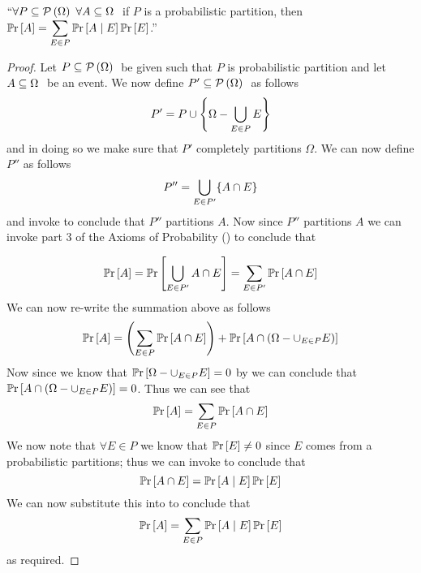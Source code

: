         \begin{theorem}
            $``\forall P \subseteq \mathcal{P}\left(\Omega\right) \  \forall A \subseteq \Omega \ $
            if $P$ is a probabilistic partition, then $\mathbb{P}\mathrm{r} \left[A\right] = \displaystyle\sum_{E \in P} \mathbb{P}\mathrm{r}\left[A \mid E\right] \mathbb{P}\mathrm{r} \left[E\right]$.''
            \label{The Law of Total Probability}
        \end{theorem}
        \begin{proof}
            Let $P \subseteq \mathcal{P}\left(\Omega\right) \ $ be given such that $P$ is probabilistic partition
            and let $A \subseteq \Omega \ $ be an event. We now define $P' \subseteq \mathcal{P}\left(\Omega\right) \ $
            as follows
            \[
                P' = P \cup \left\{\Omega - \displaystyle\bigcup_{E \in P} E\right\}
            \]
            and in doing so we make sure that $P'$ completely partitions $\Omega$. We
            can now define $P''$ as follows
            \[
                P'' = \displaystyle\bigcup_{E \in P'} \{A \cap E\}
            \]
            and invoke  to conclude that $P''$ partitions $A$.
            Now since $P''$ partitions $A$ we can invoke part 3 of the Axioms of Probability
            () to conclude that

            \[
                \mathbb{P}\mathrm{r} \left[A\right] = \mathbb{P}\mathrm{r} \left[\displaystyle\bigcup_{E \in P'} A \cap E\right] = \sum_{E \in P'} \mathbb{P}\mathrm{r} \left[A \cap E\right]
            \]
            We can now re-write the summation above as follows
            \[
                \mathbb{P}\mathrm{r} \left[A\right] = \left(\sum_{E \in P} \mathbb{P}\mathrm{r} \left[A \cap E\right]\right) + \mathbb{P}\mathrm{r} \left[A \cap \left(\Omega - \cup_{E \in P} E\right)\right]
            \]
            Now since we know that $\mathbb{P}\mathrm{r} \left[\Omega - \cup_{E \in P} E\right] = 0$ by 
            we can conclude that $\mathbb{P}\mathrm{r} \left[A \cap \left(\Omega - \cup_{E \in P} E\right)\right] = 0$. Thus
            we can see that
            \begin{equation}
                \mathbb{P}\mathrm{r} \left[A\right] = \sum_{E \in P} \mathbb{P}\mathrm{r} \left[A \cap E\right]
                \label{LTP equation 1}
            \end{equation}
            We now note that $\forall E \in P$ we know that $\mathbb{P}\mathrm{r} \left[E\right] \neq 0$ since $E$ comes
            from a probabilistic partitions; thus we can invoke 
            to conclude that
            \[
                \mathbb{P}\mathrm{r} \left[A \cap E\right] = \mathbb{P}\mathrm{r}\left[A \mid E\right] \mathbb{P}\mathrm{r} \left[E\right]
            \]
            We can now substitute this into 
            to conclude that 
            \[
                \mathbb{P}\mathrm{r} \left[A\right] = \sum_{E \in P} \mathbb{P}\mathrm{r}\left[A \mid E\right] \mathbb{P}\mathrm{r} \left[E\right]
            \]
            as required. \QED
        \end{proof}
